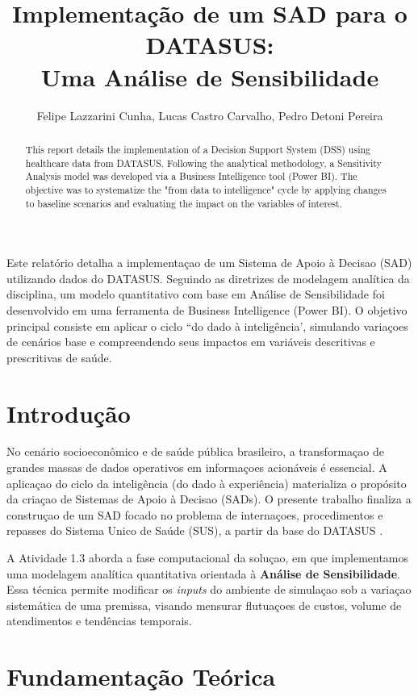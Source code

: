 \documentclass[12pt]{article}
\title{Implementação de um SAD para o DATASUS:\\Uma Análise de Sensibilidade}
\author{Felipe Lazzarini Cunha, Lucas Castro Carvalho, Pedro Detoni Pereira}
\begin{document}
\maketitle

\begin{abstract}
This report details the implementation of a Decision Support System (DSS) using healthcare data from DATASUS. Following the analytical methodology, a Sensitivity Analysis model was developed via a Business Intelligence tool (Power BI). The objective was to systematize the "from data to intelligence" cycle by applying changes to baseline scenarios and evaluating the impact on the variables of interest.
\end{abstract}

\begin{resumo}
Este relatório detalha a implementaçao de um Sistema de Apoio à Decisao (SAD) utilizando dados do DATASUS. Seguindo as diretrizes de modelagem analítica da disciplina, um modelo quantitativo com base em Análise de Sensibilidade foi desenvolvido em uma ferramenta de Business Intelligence (Power BI). O objetivo principal consiste em aplicar o ciclo ``do dado à inteligência', simulando variaçoes de cenários base e compreendendo seus impactos em variáveis descritivas e prescritivas de saúde.
\end{resumo}

\section{Introdução}
No cenário socioeconômico e de saúde pública brasileiro, a transformaçao de grandes massas de dados operativos em informaçoes acionáveis é essencial. A aplicaçao do ciclo da inteligência (do dado à experiência) materializa o propósito da criaçao de Sistemas de Apoio à Decisao (SADs). O presente trabalho finaliza a construçao de um SAD focado no problema de internaçoes, procedimentos e repasses do Sistema Unico de Saúde (SUS), a partir da base do DATASUS \cite{datasus}.

A Atividade 1.3 aborda a fase computacional da soluçao, em que implementamos uma modelagem analítica quantitativa orientada à \textbf{Análise de Sensibilidade}. Essa técnica permite modificar os \textit{inputs} do ambiente de simulaçao sob a variaçao sistemática de uma premissa, visando mensurar flutuaçoes de custos, volume de atendimentos e tendências temporais.

\section{Fundamentação Teórica}
\end{document}
